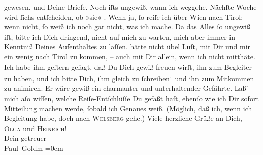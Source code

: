 \begin{ledgroupsized}[t]{13cm}
{{{                  gewesen.}}}\label{K_L03379-2h} und Deine Briefe.\pend
           \pstart
           Noch iſts ungewiß, wann ich weggehe. Nächſte Woche wird ſichs entſcheiden, ob »sie« \label{K_L03379-1v}\label{K_L03379-1h}. Wenn
               ja, ſo \strikeout{\textcolor{gray}{k}} reiſe ich über Wien nach Tirol; wenn nicht, ſo weiß ich noch gar nicht, was ich
               mache. Da das Alles ſo ungewiß iſt, bitte ich Dich dringend, nicht auf mich zu
               warten, mich aber immer in Kenntniß Deines Aufenthaltes {\pb}zu laſſen.\pend
           \pstart
           \label{K_L03379-4v}\label{K_L03379-4h} hätte nicht übel
               Luſt, mit Dir und mir ein wenig nach Tirol zu kommen, – auch mit Dir allein, wenn ich nicht mitthäte. Ich habe
               ihm geſtern geſagt, daß Du Dich gewiß freuen wirſt,
               ihn zum Begleiter zu haben, und ich bitte Dich, ihm gleich zu ſchreiben\substVorne{}\textsuperscript{,}\substDazwischen{} und\substHinten{} ihn zum Mitkommen zu animiren. Er wäre gewiß ein charmanter und
               unterhaltender Gefährte. Laß’ mich aſo wiſſen, {\pb}welche Reiſe-Entſchlüſſe Du gefaßt haſt, ebenſo wie ich Dir sofort Mitteilung
               machen werde, ſobald ich Genaues weiß. (Möglich, daß ich, wenn ich Begleitung habe, doch nach \textsc{Welsberg} gehe.)\pend
           \pstart
           Viele herzliche Grüße an Dich, \textsc{Olga} und \textsc{Heinrich}! {\\[\baselineskip]}Dein getreuer {\\[\baselineskip]}\spacefill\mbox{Paul Goldm}\pend
           \leftskip=0em{}
         
         \endnumbering{}\end{ledgroupsized}\begin{anhang}\end{anhang}\newcommand{\dateiname}{L03379}\newcommand{\titel}{Paul Goldmann an Arthur Schnitzler, 31. 7. [1903]}\newcommand{\editorInnen}{Martin Anton Müller und Laura Untner}
      